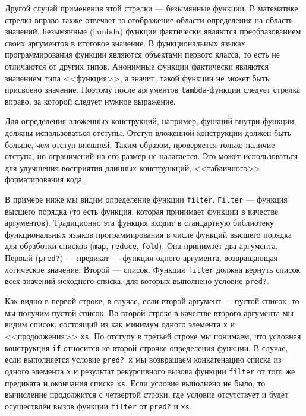         Другой случай применения этой стрелки --- безымянные функции.
        В математике стрелка вправо также отвечает за отображение области определения на область значений.
        Безымянные (lambda) функции фактически являются преобразованием своих аргументов в итоговое значение.
        В функциональных языках программирования функции являются объектами первого класса, то есть не отличаются от других типов.
        Анонимные функции фактически являются значением типа <<функция>>, а значит, такой функции не может быть присвоено значение.
        Поэтому после аргументов \verb$lambda$-функции следует стрелка вправо, за которой следует нужное выражение.

        Для определения вложенных конструкций, например, функций внутри функции, должны использоваться отступы.
        Отступ вложенной конструкции должен быть больше, чем отступ внешней.
        Таким образом, проверяется только наличие отступа, но ограничений на его размер не налагается.
        Это может использоваться для улучшения восприятия длинных констрункций, <<табличного>> форматирования кода.

        В примере ниже мы видим определение функции \verb!filter!.
        \verb$Filter$ --- функция высшего порядка (то есть функция, которая принимает функции в качестве аргументов).
        Традиционно эта функция входит в стандартную библиотеку функциональных языков программирования в числе функций высшего порядка для обработки списков (\verb#map#, \verb#reduce#, \verb#fold#).
        Она принимает два аргумента.
        Первый (\verb$pred?$) --- предикат --- функция одного аргумента, возвращающая логическое значение.
        Второй --- список.
        Функция \verb#filter# должна вернуть список всех значений исходного списка, для которых выполнено условие \verb#pred?#.

        Как видно в первой строке, в случае, если второй аргумент --- пустой список, то мы получим пустой список.
        Во второй строке в качестве второго аргумента мы видим список, состоящий из как минимум одного элемента \verb$x$ и <<продолжения>> \verb$xs$.
        По отступу в третьей строке мы понимаем, что условная конструкция \verb$if$ относится ко второй строчке определения функции.
        В случае, если выполняется условие \verb$pred? x$ мы возвращаем конкатенацию списка из одного элемента \verb$x$ и результат рекурсивного вызова функции \verb$filter$ от того же предиката и окончания списка \verb$xs$.
        Если условие выполнено не было, то вычисление продолжится с четвёртой строки, где условие отсутствует и будет осуществлён вызов функции \verb$filter$ от \verb$pred?$ и \verb$xs$.

